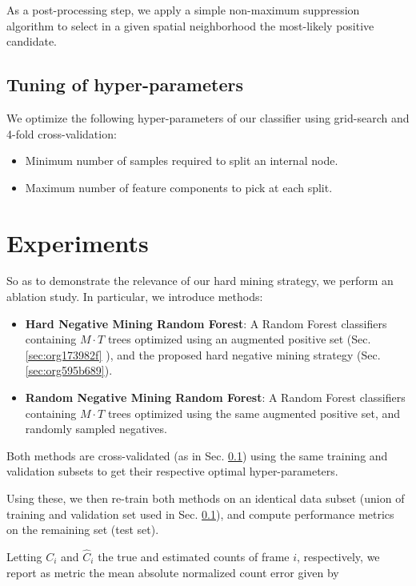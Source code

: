 \documentclass[11pt]{article}
\begin{document}
As a post-processing step, we apply a simple non-maximum suppression algorithm to select
in a given spatial neighborhood
the most-likely positive candidate.

\subsection{Tuning of hyper-parameters}
\label{sec:org2fddd4c}

We optimize the following hyper-parameters of our classifier using grid-search and 4-fold cross-validation:

\begin{itemize}
\item Minimum number of samples required to split an internal node.
\item Maximum number of feature components to pick at each split.
\end{itemize}

\section{Experiments}
\label{sec:org7ca3cad}

So as to demonstrate the relevance of our hard mining strategy, we perform an ablation study.
In particular, we introduce methods:

\begin{itemize}
\item \textbf{Hard Negative Mining Random Forest}: A Random Forest classifiers containing \(M \cdot T\) trees
optimized using an augmented positive set (Sec. \ref{sec:org173982f} ), and the proposed hard negative mining strategy (Sec. \ref{sec:org595b689}).
\item \textbf{Random Negative Mining Random Forest}: A Random Forest classifiers containing \(M \cdot T\) trees
optimized using the same augmented positive set, and randomly sampled negatives.
\end{itemize}

Both methods are cross-validated (as in Sec. \ref{sec:org2fddd4c}) using the same training and validation subsets to get their respective
optimal hyper-parameters.

Using these, we then re-train both methods on an identical data subset (union of training and validation set used in Sec. \ref{sec:org2fddd4c}), and compute performance metrics on the remaining set (test set).

Letting \(C_i\) and \(\hat{C}_i\) the true and estimated counts of frame \(i\), respectively, we report as metric the mean absolute normalized count error given by
\end{document}
